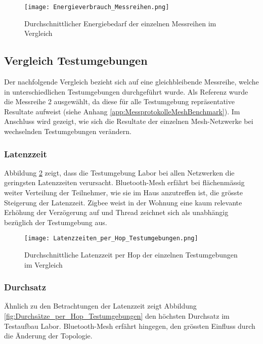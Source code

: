 \begin{figure}[H]
	\centering
	\texttt{[image: Energieverbrauch\_Messreihen.png]}
	\caption{Durchschnittlicher Energiebedarf der einzelnen Messreihen im Vergleich}\label{fig:EnergieverbrauchMessreihen}
\end{figure}


\subsection{Vergleich Testumgebungen}\label{subsec:VergleichTestumgebungen}

Der nachfolgende Vergleich bezieht sich auf eine gleichbleibende Messreihe, welche in unterschiedlichen Testumgebungen durchgeführt wurde.
Als Referenz wurde die Messreihe 2 ausgewählt, da diese für alle Testumgebung repräsentative Resultate aufweist (siehe Anhang \ref{app:MessprotokolleMeshBenchmark}).
Im Anschluss wird gezeigt, wie sich die Resultate der einzelnen Mesh-Netzwerke bei wechselnden Testumgebungen verändern.

\subsubsection{Latenzzeit}\label{subsec:VergleichLatenzzeitTestumgebungen}
Abbildung \ref{fig:Latenzzeiten_per_Hop_Testumgebungen} zeigt, dass die Testumgebung Labor bei allen Netzwerken die geringsten Latenzzeiten verursacht.
Bluetooth-Mesh erfährt bei flächenmässig weiter Verteilung der Teilnehmer, wie sie im Haus anzutreffen ist, die grösste Steigerung der Latenzzeit. Zigbee weist in der Wohnung eine kaum relevante Erhöhung der Verzögerung auf und Thread zeichnet sich als unabhängig bezüglich der Testumgebung aus. 

\begin{figure}[H]
	\centering
	\texttt{[image: Latenzzeiten\_per\_Hop\_Testumgebungen.png]}
	\caption{Durchschnittliche Latenzzeit per Hop der einzelnen Testumgebungen im Vergleich}\label{fig:Latenzzeiten_per_Hop_Testumgebungen}
\end{figure}

\newpage
\subsubsection{Durchsatz}\label{subsec:VergleichDurchsatzTestumgebungen}
Ähnlich zu den Betrachtungen der Latenzzeit zeigt Abbildung \ref{fig:Durchsätze_per_Hop_Testumgebungen} den höchsten Durchsatz im Testaufbau Labor.
Bluetooth-Mesh erfährt hingegen, den grössten Einfluss durch die Änderung der Topologie. 

